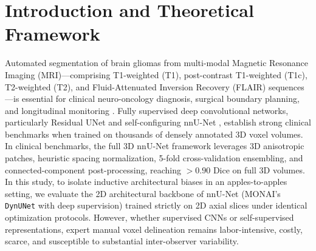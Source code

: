 \documentclass{article}
\begin{document}
\begin{abstract}
standalone clinical deployment. We note that the transition from I-JEPA to SigReg/VisReg JEPA simultaneously changes both the anti-collapse mechanism (EMA teacher vs.\ analytical regularization) and the network topology (dual-encoder vs.\ single-encoder with projector head), preventing isolated causal attribution to either factor. We conclude that the combined single-encoder recipe with analytical distribution matching provides a competitive, teacher-free alternative for JEPA pre-training in medical imaging, and we explicitly delineate the architectural confounders, boundary conditions, and factorial ablations required to disentangle these contributions.
\end{abstract}


\section{Introduction and Theoretical Framework}

Automated segmentation of brain gliomas from multi-modal Magnetic Resonance Imaging (MRI)---comprising T1-weighted (T1), post-contrast T1-weighted (T1c), T2-weighted (T2), and Fluid-Attenuated Inversion Recovery (FLAIR) sequences---is essential for clinical neuro-oncology diagnosis, surgical boundary planning, and longitudinal monitoring \citep{brats2024}. Fully supervised deep convolutional networks, particularly Residual UNet \citep{ronneberger2015u} and self-configuring nnU-Net \citep{isensee2021nnunet}, establish strong clinical benchmarks when trained on thousands of densely annotated 3D voxel volumes. In clinical benchmarks, the full 3D nnU-Net framework leverages 3D anisotropic patches, heuristic spacing normalization, 5-fold cross-validation ensembling, and connected-component post-processing, reaching $>0.90$ Dice on full 3D volumes. In this study, to isolate inductive architectural biases in an apples-to-apples setting, we evaluate the 2D architectural backbone of nnU-Net (MONAI's \texttt{DynUNet} with deep supervision) trained strictly on 2D axial slices under identical optimization protocols. However, whether supervised CNNs or self-supervised representations, expert manual voxel delineation remains labor-intensive, costly, scarce, and susceptible to substantial inter-observer variability.
\end{document}
